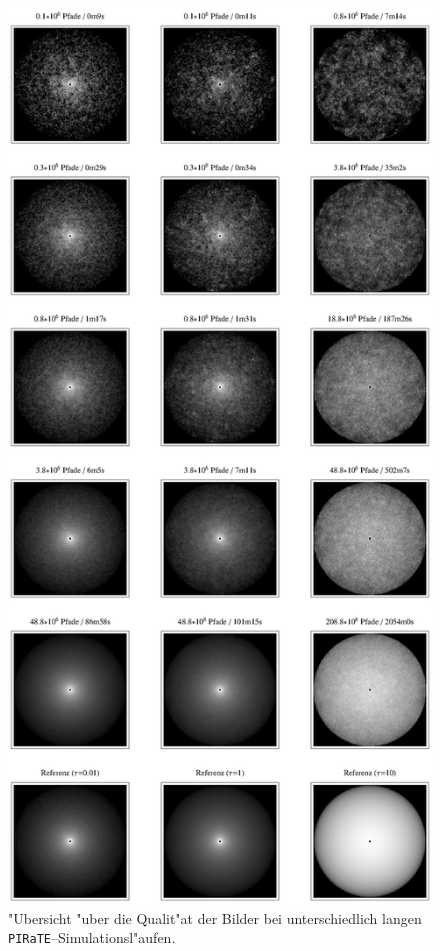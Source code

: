 		\begin{figure}
			\centering
			\includegraphics[height=1.0\textheight]{piratesphereimageoverview.eps}
			\caption{"Ubersicht "uber die Qualit"at der Bilder bei unterschiedlich langen \texttt{PIRaTE}--Simulationsl"aufen.}
			\label{fig:pirate_sphere_imageoverview}
		\end{figure}
	
